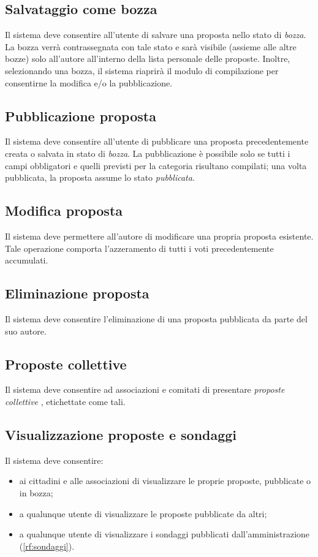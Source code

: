 \begin{rfscope}
\subsection{Salvataggio come bozza} \label{rf:salvataggiobozza}
Il sistema deve consentire all'utente di salvare una proposta nello stato di \emph{bozza}. La bozza verrà contrassegnata con tale stato e sarà visibile (assieme alle altre bozze) solo all’autore all’interno della lista personale delle proposte. Inoltre, selezionando una bozza, il sistema riaprirà il modulo di compilazione per consentirne la modifica e/o la pubblicazione.

\subsection{Pubblicazione proposta} \label{rf:pubblicazioneproposta}
Il sistema deve consentire all'utente di pubblicare una proposta precedentemente creata o salvata in stato di \emph{bozza}.  
La pubblicazione è possibile solo se tutti i campi obbligatori e quelli previsti per la categoria risultano compilati; una volta pubblicata, la proposta assume lo stato \emph{pubblicata}.

\subsection{Modifica proposta} \label{rf:modificaproposta}
Il sistema deve permettere all'autore di modificare una propria proposta esistente. Tale operazione comporta l'azzeramento di tutti i voti precedentemente accumulati.

\subsection{Eliminazione proposta} \label{rf:eliminazioneproposta}
Il sistema deve consentire l'eliminazione di una proposta pubblicata da parte del suo autore.

\subsection{Proposte collettive} \label{rf:propostecollettive}
Il sistema deve consentire ad associazioni e comitati di presentare \emph{proposte collettive} , etichettate come tali.

\subsection{Visualizzazione proposte e sondaggi}
Il sistema deve consentire:
\begin{itemize}
  \item ai cittadini e alle associazioni di visualizzare le proprie proposte, pubblicate o in bozza;
  \item a qualunque utente di visualizzare le proposte pubblicate da altri;
  \item a qualunque utente di visualizzare i sondaggi pubblicati dall’amministrazione (\ref{rf:sondaggi}).
\end{itemize}


\end{rfscope}
